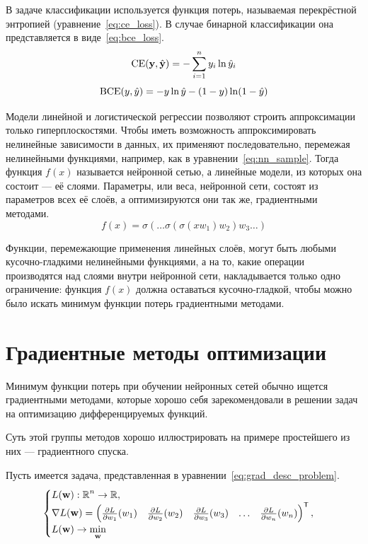 В задаче классификации используется функция потерь, называемая перекрёстной энтропией (уравнение \ref*{eq:ce_loss}). В случае бинарной классификации она представляется в виде \ref*{eq:bce_loss}.
\begin{equation}
    \label{eq:ce_loss}
    \operatorname{CE}(\mathbf{y},\hat{\mathbf{y}})=-\sum\limits_{i=1}^n y_i \ln \hat{y}_i
\end{equation}
\begin{equation}
    \label{eq:bce_loss}
    \operatorname{BCE}(y,\hat{y})=-y \ln \hat{y} - (1-y)\ln (1-\hat{y})
\end{equation}

Модели линейной и логистической регрессии позволяют строить аппроксимации только гиперплоскостями. Чтобы иметь возможность аппроксимировать нелинейные зависимости в данных, их применяют последовательно, перемежая нелинейными функциями, например, как в уравнении \ref*{eq:nn_sample}. Тогда функция $f(x)$ называется нейронной сетью, а линейные модели, из которых она состоит --- её слоями. Параметры, или веса, нейронной сети, состоят из параметров всех её слоёв, а оптимизируются они так же, градиентными методами.
\begin{equation}
    \label{eq:nn_sample}
    f(x)=\sigma(\dots \sigma(\sigma(xw_1)w_2)w_3 \dots)
\end{equation}

Функции, перемежающие применения линейных слоёв, могут быть любыми кусочно-гладкими нелинейными функциями, а на то, какие операции производятся над слоями внутри нейронной сети, накладывается только одно ограничение: функция $f(x)$ должна оставаться кусочно-гладкой, чтобы можно было искать минимум функции потерь градиентными методами.

\section{Градиентные методы оптимизации}

Минимум функции потерь при обучении нейронных сетей обычно ищется градиентными методами, которые хорошо себя зарекомендовали в решении задач на оптимизацию дифференцируемых функций.

Суть этой группы методов хорошо иллюстрировать на примере простейшего из них --- градиентного спуска.

Пусть имеется задача, представленная в уравнении \ref*{eq:grad_desc_problem}.
\begin{equation}
    \label{eq:grad_desc_problem}
    \begin{cases}
        L(\mathbf{w}): \operatorname{\mathbb{R}}^n \rightarrow \operatorname{\mathbb{R}}, \\
        \nabla L(\mathbf{w}) = \left(\begin{matrix}
            \frac{\partial L}{\partial w_1}(w_1) &
            \frac{\partial L}{\partial w_2}(w_2) &
            \frac{\partial L}{\partial w_3}(w_3) &
            \hdots &
            \frac{\partial L}{\partial w_n}(w_n)
        \end{matrix}\right)^\mathsf{T}, \\
        L(\mathbf{w}) \rightarrow \min\limits_\mathbf{w}
    \end{cases}
\end{equation}

